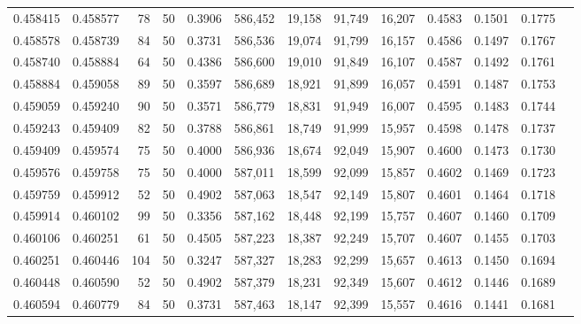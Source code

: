 \begin{tabular}{rrrrrrrrrrrrr}
0.458415 & 0.458577 &    78 &  50 &                                     0.3906 & 586,452 &  19,158 &  91,749 &  16,207 & 0.4583 & 0.1501 & 0.1775 \\
0.458578 & 0.458739 &    84 &  50 &                                     0.3731 & 586,536 &  19,074 &  91,799 &  16,157 & 0.4586 & 0.1497 & 0.1767 \\
0.458740 & 0.458884 &    64 &  50 &                                     0.4386 & 586,600 &  19,010 &  91,849 &  16,107 & 0.4587 & 0.1492 & 0.1761 \\
0.458884 & 0.459058 &    89 &  50 &                                     0.3597 & 586,689 &  18,921 &  91,899 &  16,057 & 0.4591 & 0.1487 & 0.1753 \\
0.459059 & 0.459240 &    90 &  50 &                                     0.3571 & 586,779 &  18,831 &  91,949 &  16,007 & 0.4595 & 0.1483 & 0.1744 \\
0.459243 & 0.459409 &    82 &  50 &                                     0.3788 & 586,861 &  18,749 &  91,999 &  15,957 & 0.4598 & 0.1478 & 0.1737 \\
0.459409 & 0.459574 &    75 &  50 &                                     0.4000 & 586,936 &  18,674 &  92,049 &  15,907 & 0.4600 & 0.1473 & 0.1730 \\
0.459576 & 0.459758 &    75 &  50 &                                     0.4000 & 587,011 &  18,599 &  92,099 &  15,857 & 0.4602 & 0.1469 & 0.1723 \\
0.459759 & 0.459912 &    52 &  50 &                                     0.4902 & 587,063 &  18,547 &  92,149 &  15,807 & 0.4601 & 0.1464 & 0.1718 \\
0.459914 & 0.460102 &    99 &  50 &                                     0.3356 & 587,162 &  18,448 &  92,199 &  15,757 & 0.4607 & 0.1460 & 0.1709 \\
0.460106 & 0.460251 &    61 &  50 &                                     0.4505 & 587,223 &  18,387 &  92,249 &  15,707 & 0.4607 & 0.1455 & 0.1703 \\
0.460251 & 0.460446 &   104 &  50 &                                     0.3247 & 587,327 &  18,283 &  92,299 &  15,657 & 0.4613 & 0.1450 & 0.1694 \\
0.460448 & 0.460590 &    52 &  50 &                                     0.4902 & 587,379 &  18,231 &  92,349 &  15,607 & 0.4612 & 0.1446 & 0.1689 \\
0.460594 & 0.460779 &    84 &  50 &                                     0.3731 & 587,463 &  18,147 &  92,399 &  15,557 & 0.4616 & 0.1441 & 0.1681 \\

\end{tabular}
